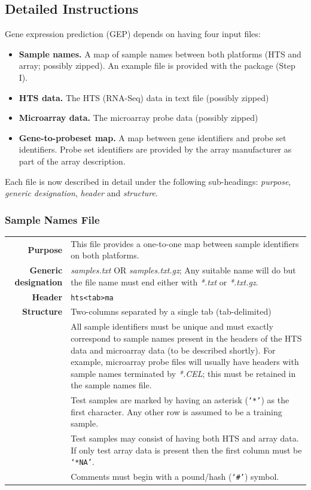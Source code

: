 \documentclass[a4paper,12pt]{article}
\begin{document}
\subsection{Detailed Instructions}
\label{gep:detailed}
Gene expression prediction (GEP) depends on having four input files:
\begin{itemize}
\item \textbf{Sample names.} A map of sample names between both platforms (HTS and array; possibly zipped). An example file is provided with the package (Step I).
\item \textbf{HTS data.} The HTS (RNA-Seq) data in text file (possibly zipped)
\item \textbf{Microarray data.} The microarray probe data (possibly zipped) 
\item \textbf{Gene-to-probeset map.} A map between gene identifiers and probe set identifiers. Probe set identifiers are provided by the array manufacturer as part of the array description.
\end{itemize}

Each file is now described in detail under the following sub-headings: \textit{purpose}, \textit{generic designation}, \textit{header} and \textit{structure}.

\subsubsection{Sample Names File}
\label{gep:sample}

\begin{tabular}{rp{12cm}}
\textbf{Purpose} & This file provides a one-to-one map between sample identifiers on both platforms. \\
\textbf{Generic designation} & \textit{samples.txt} OR \textit{samples.txt.gz}; Any suitable name will do but the file name must end either with \textit{*.txt} or \textit{*.txt.gz}. \\
\textbf{Header} & \texttt{hts\textless tab\textgreater ma} \\
\textbf{Structure} & Two-columns separated by a single tab (tab-delimited) \\
  & All sample identifiers must be unique and must exactly correspond to sample names present in the headers of the HTS data and microarray data (to be described shortly). For example, microarray probe files will usually have headers with sample names terminated by \textit{*.CEL}; this must be retained in the sample names file. \\
  & Test samples are marked by having an asterisk (\texttt{`*'}) as the first character. Any other row is assumed to be a training sample. \\
  & Test samples may consist of having both HTS and array data. If only test array data is present then the first column must be \texttt{`*NA'}. \\
  & Comments must begin with a pound/hash (\texttt{`\#'}) symbol. \\
\end{tabular}
\end{document}
